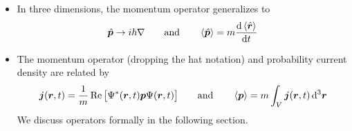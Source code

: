 \documentclass[11pt, a4paper]{article}
\newcommand{\diff}{\mathop{}\!\mathrm{d}} %
\newcommand{\dr}{\diff^{3} \r}  %
\renewcommand{\grad}{\nabla}
\newcommand{\eqtext}[1]{\qquad \text{#1} \qquad}
\renewcommand{\vec}[1]{\bm{#1}} %
\renewcommand{\r}{\vec{r}}  %
\renewcommand{\P}{\Psi}  %
\begin{document}
\begin{itemize}
	\item In three dimensions, the momentum operator generalizes to 
	\begin{equation*}
		\hat{\vec{p}} \to i \hbar \grad \eqtext{and}  \ev{\hat{\vec{p}}} = m \dv{\ev{\hat{\vec{r}}}}{t}
	\end{equation*}
	
	\item The momentum operator (dropping the hat notation) and probability current density are related by
	\begin{equation*}
		\vec{j}(\r, t) = \frac{1}{m}\Re \big[\P^{*}(\r, t) \vec{p} \P(\r, t)\big] \eqtext{and} \ev{\bm{p}}  = m \int_{V} \vec{j}(\r, t) \dr
	\end{equation*}
	We discuss operators formally in the following section.
\end{itemize}
\end{document}
